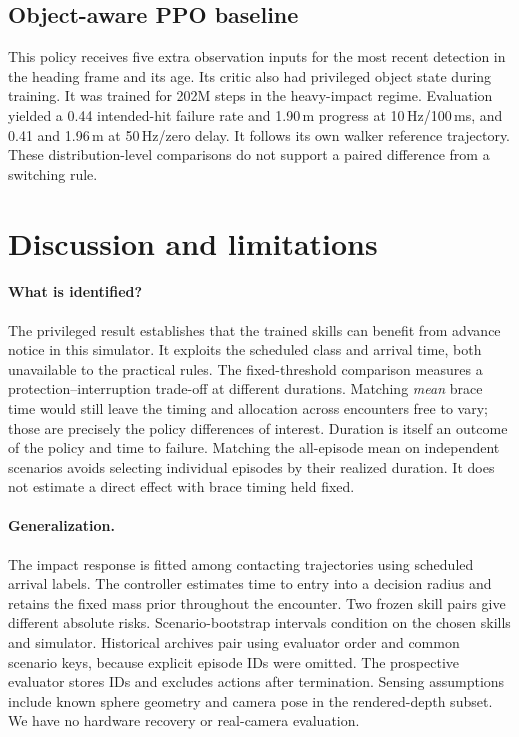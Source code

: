 \documentclass[10pt,twocolumn]{article}
\begin{document}
\subsection{Object-aware PPO baseline} This policy receives five extra observation inputs for the most recent detection in the heading frame and its age. Its critic also had privileged object state during training. It was trained for 202M steps in the heavy-impact regime. Evaluation yielded a 0.44 intended-hit failure rate and 1.90\,m progress at 10\,Hz/100\,ms, and 0.41 and 1.96\,m at 50\,Hz/zero delay. It follows its own walker reference trajectory. These distribution-level comparisons do not support a paired difference from a switching rule.



\section{Discussion and limitations}
\paragraph{What is identified?} The privileged result establishes that the trained skills can benefit from advance notice in this simulator. It exploits the scheduled class and arrival time, both unavailable to the practical rules. The fixed-threshold comparison measures a protection--interruption trade-off at different durations. Matching \emph{mean} brace time would still leave the timing and allocation across encounters free to vary; those are precisely the policy differences of interest. Duration is itself an outcome of the policy and time to failure. Matching the all-episode mean on independent scenarios avoids selecting individual episodes by their realized duration. It does not estimate a direct effect with brace timing held fixed.
\paragraph{Generalization.} The impact response is fitted among contacting trajectories using scheduled arrival labels. The controller estimates time to entry into a decision radius and retains the fixed mass prior throughout the encounter. Two frozen skill pairs give different absolute risks. Scenario-bootstrap intervals condition on the chosen skills and simulator. Historical archives pair using evaluator order and common scenario keys, because explicit episode IDs were omitted. The prospective evaluator stores IDs and excludes actions after termination. Sensing assumptions include known sphere geometry and camera pose in the rendered-depth subset. We have no hardware recovery or real-camera evaluation.
\end{document}
